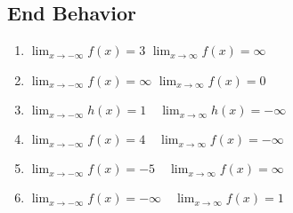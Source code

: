 \subsection*{End Behavior}
\begin{enumerate}
	\item $\lim_{x \to -\infty} f(x) = 3$ \quad $\lim_{x \to \infty} f(x) = \infty$
	\item $\lim_{x \to -\infty} f(x) = \infty$ \quad $\lim_{x \to \infty} f(x) =0$ 
	\item $\lim_{x \to -\infty} h(x) = 1 \quad \lim_{x \to \infty} h(x) = - \infty$
	\item $\lim_{x \to -\infty} f(x) = 4 \quad \lim_{x \to \infty} f(x) = -\infty$
    \item $\lim_{x \to -\infty} f(x) = -5 \quad \lim_{x \to \infty} f(x) = \infty$
    \item $\lim_{x \to -\infty} f(x) = -\infty \quad \lim_{x \to \infty} f(x) = 1$
\end{enumerate}
